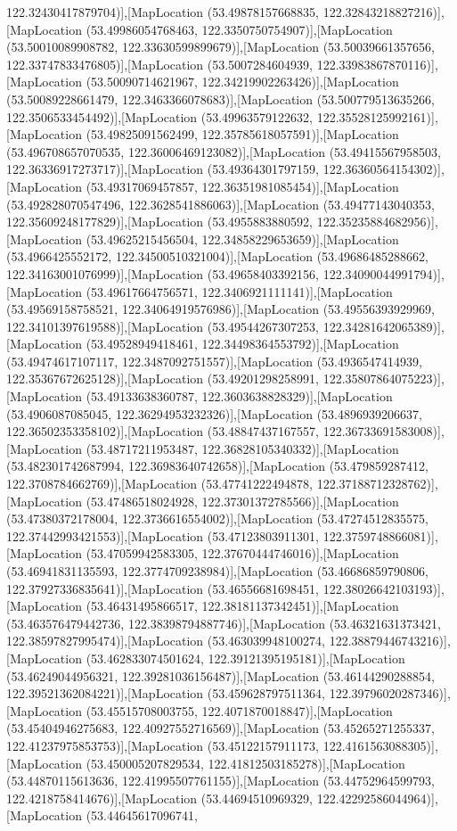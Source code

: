 122.32430417879704)],[MapLocation (53.49878157668835, 122.32843218827216)],[MapLocation (53.49986054768463, 122.3350750754907)],[MapLocation (53.50010089908782, 122.33630599899679)],[MapLocation (53.50039661357656, 122.33747833476805)],[MapLocation (53.5007284604939, 122.33983867870116)],[MapLocation (53.50090714621967, 122.34219902263426)],[MapLocation (53.50089228661479, 122.3463366078683)],[MapLocation (53.500779513635266, 122.3506533454492)],[MapLocation (53.49963579122632, 122.35528125992161)],[MapLocation (53.49825091562499, 122.35785618057591)],[MapLocation (53.496708657070535, 122.36006469123082)],[MapLocation (53.49415567958503, 122.36336917273717)],[MapLocation (53.49364301797159, 122.36360564154302)],[MapLocation (53.49317069457857, 122.36351981085454)],[MapLocation (53.492828070547496, 122.3628541886063)],[MapLocation (53.49477143040353, 122.35609248177829)],[MapLocation (53.4955883880592, 122.35235884682956)],[MapLocation (53.49625215456504, 122.34858229653659)],[MapLocation (53.4966425552172, 122.34500510321004)],[MapLocation (53.49686485288662, 122.34163001076999)],[MapLocation (53.49658403392156, 122.34090044991794)],[MapLocation (53.49617664756571, 122.3406921111141)],[MapLocation (53.49569158758521, 122.34064919576986)],[MapLocation (53.49556393929969, 122.34101397619588)],[MapLocation (53.49544267307253, 122.34281642065389)],[MapLocation (53.49528949418461, 122.34498364553792)],[MapLocation (53.49474617107117, 122.3487092751557)],[MapLocation (53.4936547414939, 122.35367672625128)],[MapLocation (53.49201298258991, 122.35807864075223)],[MapLocation (53.49133638360787, 122.3603638828329)],[MapLocation (53.4906087085045, 122.36294953232326)],[MapLocation (53.4896939206637, 122.36502353358102)],[MapLocation (53.48847437167557, 122.36733691583008)],[MapLocation (53.48717211953487, 122.36828105340332)],[MapLocation (53.482301742687994, 122.36983640742658)],[MapLocation (53.479859287412, 122.3708784662769)],[MapLocation (53.47741222494878, 122.37188712328762)],[MapLocation (53.47486518024928, 122.37301372785566)],[MapLocation (53.47380372178004, 122.3736616554002)],[MapLocation (53.47274512835575, 122.37442993421553)],[MapLocation (53.47123803911301, 122.3759748866081)],[MapLocation (53.47059942583305, 122.37670444746016)],[MapLocation (53.46941831135593, 122.3774709238984)],[MapLocation (53.46686859790806, 122.37927336835641)],[MapLocation (53.46556681698451, 122.38026642103193)],[MapLocation (53.46431495866517, 122.38181137342451)],[MapLocation (53.463576479442736, 122.38398794887746)],[MapLocation (53.46321631373421, 122.38597827995474)],[MapLocation (53.463039948100274, 122.38879446743216)],[MapLocation (53.462833074501624, 122.39121395195181)],[MapLocation (53.46249044956321, 122.39281036156487)],[MapLocation (53.46144290288854, 122.39521362084221)],[MapLocation (53.459628797511364, 122.39796020287346)],[MapLocation (53.45515708003755, 122.4071870018847)],[MapLocation (53.45404946275683, 122.40927552716569)],[MapLocation (53.45265271255337, 122.41237975853753)],[MapLocation (53.45122157911173, 122.4161563088305)],[MapLocation (53.450005207829534, 122.41812503185278)],[MapLocation (53.44870115613636, 122.41995507761155)],[MapLocation (53.44752964599793, 122.4218758414676)],[MapLocation (53.44694510969329, 122.42292586044964)],[MapLocation (53.44645617096741, 